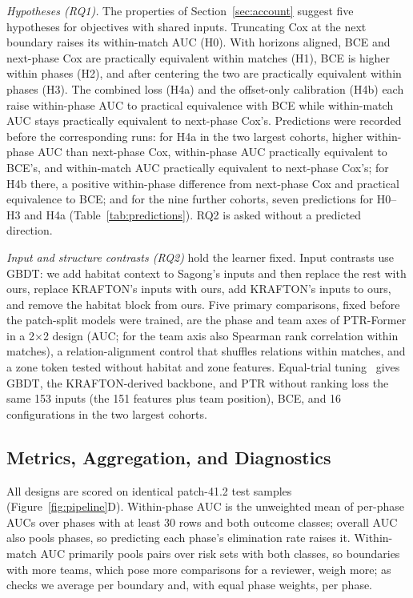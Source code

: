 \documentclass[sigconf,anonymous]{acmart}
\begin{document}
\emph{Hypotheses (RQ1).} The properties of Section~\ref{sec:account} suggest five hypotheses for objectives with shared inputs. Truncating Cox at the next boundary raises its within-match AUC (H0). With horizons aligned, BCE and next-phase Cox are practically equivalent within matches (H1), BCE is higher within phases (H2), and after centering the two are practically equivalent within phases (H3). The combined loss (H4a) and the offset-only calibration (H4b) each raise within-phase AUC to practical equivalence with BCE while within-match AUC stays practically equivalent to next-phase Cox's. Predictions were recorded before the corresponding runs: for H4a in the two largest cohorts, higher within-phase AUC than next-phase Cox, within-phase AUC practically equivalent to BCE's, and within-match AUC practically equivalent to next-phase Cox's; for H4b there, a positive within-phase difference from next-phase Cox and practical equivalence to BCE; and for the nine further cohorts, seven predictions for H0--H3 and H4a (Table~\ref{tab:predictions}). RQ2 is asked without a predicted direction.

\emph{Input and structure contrasts (RQ2)} hold the learner fixed. Input contrasts use GBDT: we add habitat context to Sagong's inputs and then replace the rest with ours, replace KRAFTON's inputs with ours, add KRAFTON's inputs to ours, and remove the habitat block from ours. Five primary comparisons, fixed before the patch-split models were trained, are the phase and team axes of PTR-Former in a 2$\times$2 design (AUC; for the team axis also Spearman rank correlation within matches), a relation-alignment control that shuffles relations within matches, and a zone token tested without habitat and zone features. Equal-trial tuning~\cite{Bergstra12,Cawley10} gives GBDT, the KRAFTON-derived backbone, and PTR without ranking loss the same 153 inputs (the 151 features plus team position), BCE, and 16 configurations in the two largest cohorts.

\subsection{Metrics, Aggregation, and Diagnostics}
\label{sec:method:units}
All designs are scored on identical patch-41.2 test samples (Figure~\ref{fig:pipeline}D). Within-phase AUC is the unweighted mean of per-phase AUCs over phases with at least 30 rows and both outcome classes; overall AUC also pools phases, so predicting each phase's elimination rate raises it. Within-match AUC primarily pools pairs over risk sets with both classes, so boundaries with more teams, which pose more comparisons for a reviewer, weigh more; as checks we average per boundary and, with equal phase weights, per phase.
\end{document}
